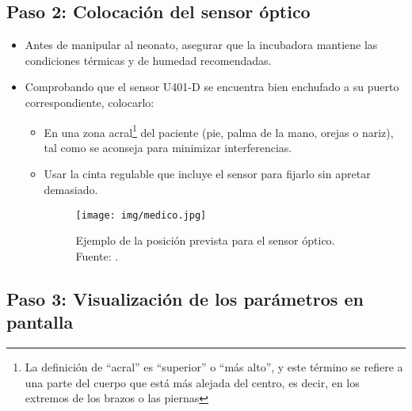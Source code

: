 \subsection{Paso 2: Colocación del sensor óptico}

\begin{itemize}
    \item Antes de manipular al neonato, asegurar que la incubadora mantiene las condiciones térmicas y de humedad recomendadas.
    \item Comprobando que el sensor U401-D se encuentra bien enchufado a su puerto correspondiente, colocarlo:
    \begin{itemize}
        \item En una zona acral\footnote{La definición de “acral” es “superior” o “más alto”, y este término se refiere a una parte del cuerpo que está más alejada del centro, es decir, en los extremos de los brazos o las piernas} del paciente (pie, palma de la mano, orejas o nariz), tal como se aconseja para minimizar interferencias.
        \item Usar la cinta regulable que incluye el sensor para fijarlo sin apretar demasiado.
        \begin{figure}[H]
            \centering
            \texttt{[image: img/medico.jpg]}
            \caption{Ejemplo de la posición prevista para el sensor óptico. Fuente: \cite{semianovich2020oximetro}. }
            \label{fig:medico}
        \end{figure}
    \end{itemize}
\end{itemize}

\subsection{Paso 3: Visualización de los parámetros en pantalla}

